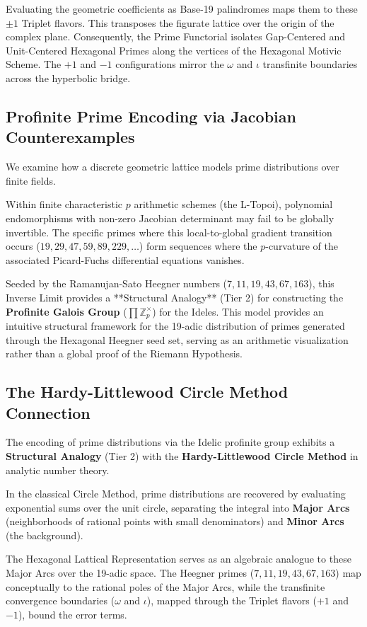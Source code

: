 Evaluating the geometric coefficients as Base-19 palindromes maps them to these $\pm 1$ Triplet flavors. This transposes the figurate lattice over the origin of the complex plane. Consequently, the Prime Functorial isolates Gap-Centered and Unit-Centered Hexagonal Primes along the vertices of the Hexagonal Motivic Scheme. The $+1$ and $-1$ configurations mirror the $\omega$ and $\iota$ transfinite boundaries across the hyperbolic bridge.

\subsection{Profinite Prime Encoding via Jacobian Counterexamples}
We examine how a discrete geometric lattice models prime distributions over finite fields.

Within finite characteristic $p$ arithmetic schemes (the L-Topoi), polynomial endomorphisms with non-zero Jacobian determinant may fail to be globally invertible. The specific primes where this local-to-global gradient transition occurs ($19, 29, 47, 59, 89, 229, \dots$) form sequences where the $p$-curvature of the associated Picard-Fuchs differential equations vanishes.

Seeded by the Ramanujan-Sato Heegner numbers ($7, 11, 19, 43, 67, 163$), this Inverse Limit provides a **Structural Analogy** (Tier 2) for constructing the \textbf{Profinite Galois Group} ($\prod \mathbb{Z}_p^\times$) for the Ideles. This model provides an intuitive structural framework for the 19-adic distribution of primes generated through the Hexagonal Heegner seed set, serving as an arithmetic visualization rather than a global proof of the Riemann Hypothesis.

\subsection{The Hardy-Littlewood Circle Method Connection}
The encoding of prime distributions via the Idelic profinite group exhibits a \textbf{Structural Analogy} (Tier 2) with the \textbf{Hardy-Littlewood Circle Method} in analytic number theory.

In the classical Circle Method, prime distributions are recovered by evaluating exponential sums over the unit circle, separating the integral into \textbf{Major Arcs} (neighborhoods of rational points with small denominators) and \textbf{Minor Arcs} (the background).

The Hexagonal Lattical Representation serves as an algebraic analogue to these Major Arcs over the 19-adic space. The Heegner primes ($7, 11, 19, 43, 67, 163$) map conceptually to the rational poles of the Major Arcs, while the transfinite convergence boundaries ($\omega$ and $\iota$), mapped through the Triplet flavors ($+1$ and $-1$), bound the error terms.

